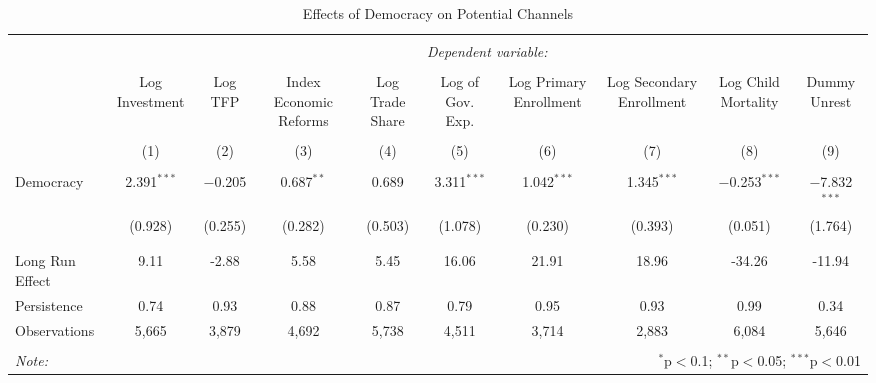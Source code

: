 
\begin{table}[!htbp] \centering 
  \caption{Effects of Democracy on Potential Channels} 
  \label{} 
\begin{tabular}{@{\extracolsep{0.01pt}}lccccccccc} 
\\[-1.8ex]\hline 
\hline \\[-1.8ex] 
 & \multicolumn{9}{c}{\textit{Dependent variable:}} \\ 
\cline{2-10} 
\\[-1.8ex] & Log Investment & Log TFP & Index Economic Reforms & Log Trade Share & Log of Gov. Exp. & Log Primary Enrollment & Log Secondary Enrollment & Log Child Mortality & Dummy Unrest \\ 
\\[-1.8ex] & (1) & (2) & (3) & (4) & (5) & (6) & (7) & (8) & (9)\\ 
\hline \\[-1.8ex] 
 Democracy & 2.391$^{***}$ & $-$0.205 & 0.687$^{**}$ & 0.689 & 3.311$^{***}$ & 1.042$^{***}$ & 1.345$^{***}$ & $-$0.253$^{***}$ & $-$7.832$^{***}$ \\ 
  & (0.928) & (0.255) & (0.282) & (0.503) & (1.078) & (0.230) & (0.393) & (0.051) & (1.764) \\ 
  & & & & & & & & & \\ 
\hline \\[-1.8ex] 
Long Run Effect & 9.11 & -2.88 & 5.58 & 5.45 & 16.06 & 21.91 & 18.96 & -34.26 & -11.94 \\ 
Persistence & 0.74 & 0.93 & 0.88 & 0.87 & 0.79 & 0.95 & 0.93 & 0.99 & 0.34 \\ 
Observations & 5,665 & 3,879 & 4,692 & 5,738 & 4,511 & 3,714 & 2,883 & 6,084 & 5,646 \\ 
\hline 
\hline \\[-1.8ex] 
\textit{Note:}  & \multicolumn{9}{r}{$^{*}$p$<$0.1; $^{**}$p$<$0.05; $^{***}$p$<$0.01} \\ 
\end{tabular} 
\end{table} 
